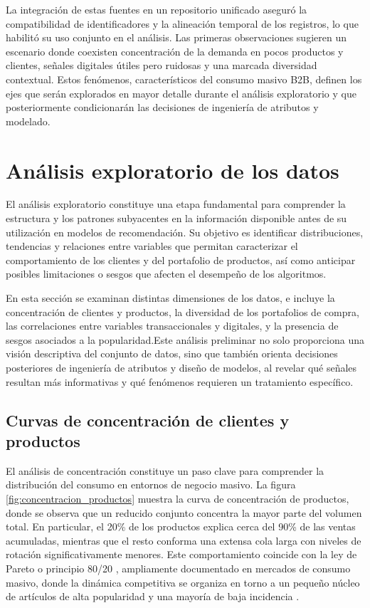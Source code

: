 La integración de estas fuentes en un repositorio unificado aseguró la compatibilidad de identificadores y la alineación temporal de los registros, lo que habilitó su uso conjunto en el análisis. Las primeras observaciones sugieren un escenario donde coexisten concentración de la demanda en pocos productos y clientes, señales digitales útiles pero ruidosas y una marcada diversidad contextual. Estos fenómenos, característicos del consumo masivo B2B, definen los ejes que serán explorados en mayor detalle durante el análisis exploratorio y que posteriormente condicionarán las decisiones de ingeniería de atributos y modelado.


\section{Análisis exploratorio de los datos}

El análisis exploratorio constituye una etapa fundamental para comprender la estructura y los patrones subyacentes en la información disponible antes de su utilización en modelos de recomendación. Su objetivo es identificar distribuciones, tendencias y relaciones entre variables que permitan caracterizar el comportamiento de los clientes y del portafolio de productos, así como anticipar posibles limitaciones o sesgos que afecten el desempeño de los algoritmos.

En esta sección se examinan distintas dimensiones de los datos, e incluye la concentración de clientes y productos, la diversidad de los portafolios de compra, las correlaciones entre variables transaccionales y digitales, y la presencia de sesgos asociados a la popularidad.Este análisis preliminar no solo proporciona una visión descriptiva del conjunto de datos, sino que también orienta decisiones posteriores de ingeniería de atributos y diseño de modelos, al revelar qué señales resultan más informativas y qué fenómenos requieren un tratamiento específico.

\subsection{Curvas de concentración de clientes y productos}

El análisis de concentración constituye un paso clave para comprender la distribución del consumo en entornos de negocio masivo. La figura \ref{fig:concentracion_productos} muestra la curva de concentración de productos, donde se observa que un reducido conjunto concentra la mayor parte del volumen total. En particular, el 20\% de los productos explica cerca del 90\% de las ventas acumuladas, mientras que el resto conforma una extensa cola larga con niveles de rotación significativamente menores. Este comportamiento coincide con la ley de Pareto o principio 80/20 \cite{BOOK:Koch1998}, ampliamente documentado en mercados de consumo masivo, donde la dinámica competitiva se organiza en torno a un pequeño núcleo de artículos de alta popularidad y una mayoría de baja incidencia \cite{BOOK:Anderson2006}.

